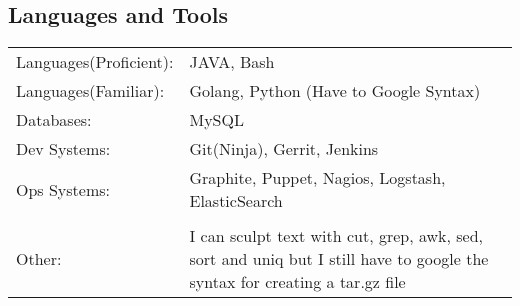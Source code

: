 \documentclass[margin]{res}
\begin{document}
\begin{resume}
\section{Languages and Tools}
   \begin{tabular}{l p{3in}}
    {Languages(Proficient):} & JAVA, Bash \\
    {Languages(Familiar):} &  Golang, Python (Have to Google Syntax) \\
    {Databases:} &  MySQL \\
    {Dev Systems:} &  Git(Ninja), Gerrit, Jenkins \\
    {Ops Systems:} &  Graphite, Puppet, Nagios, Logstash, ElasticSearch \\

    {} &   \\
    {Other:} & I can sculpt text with cut, grep, awk, sed, sort and uniq but I still have to google the syntax for creating a tar.gz file \\

 \end{tabular}



\bigskip
\bigskip


\end{resume}
\end{document}
